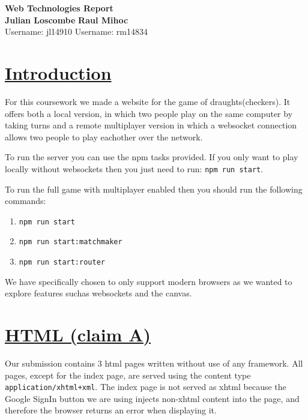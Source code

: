 \documentclass{article}
\begin{document}
 \begin{titlepage}
    \vspace*{4cm}
    \begin{center}
        \huge{\bfseries Web Technologies Report}\\
        \vspace*{10cm}
        \noindent
        \textbf{\large{Julian Loscombe}}
        \hfill
        \textbf{\large{Raul Mihoc}} \\
        \normalsize{\large{Username:} jl14910}
        \hfill
        \normalsize{\large{Username:} rm14834}
    \end{center}
 \end{titlepage}
 \section{\underline{Introduction}}\label{sec:intro}
    For this coursework we made a website for the game of draughts(checkers).
    It offers both a local version, in which two people play on the same computer by taking turns and a
    remote multiplayer version in which a websocket connection allows two people to play eachother over the network.

    \indent To run the server you can use the npm tasks provided. If you only want to play locally without websockets
    then you just need to run: \verb|npm run start|.

    \indent To run the full game with multiplayer enabled then you should run the following
    commands:
    \begin{enumerate}
    \item \verb|npm run start|
    \item \verb|npm run start:matchmaker|
    \item \verb|npm run start:router|
    \end{enumerate}
    \indent We have specifically chosen to only support modern browsers as we wanted to explore features suchas websockets and the canvas.
 \section{\underline{HTML (claim A)}}\label{sec:HTML}
    Our submission contains 3 html pages written without use of any framework. All pages, except for the index page, are served
    using the content type \verb|application/xhtml+xml|. The index page is not served as xhtml because the Google SignIn button we are using injects
    non-xhtml content into the page, and therefore the browser returns an error when displaying it.
\end{document}
